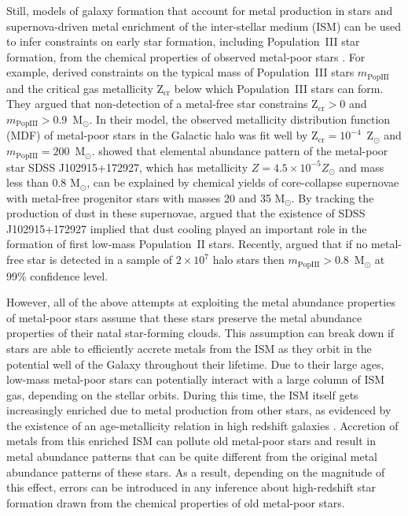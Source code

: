 \documentclass[a4paper,fleqn,usenatbib]{mnras}
\begin{document}
Still, models of galaxy formation that account for metal production in
stars and supernova-driven metal enrichment of the inter-stellar
medium (ISM) can be used to infer constraints on early star formation,
including Population~III star formation, from the chemical properties
of observed metal-poor stars \citep{2001PhR...349..125B,
  2004ARA&A..42...79B, 2005SSRv..116..625C, 2005SSRv..117..445G,
  2006jebh.book..239R, 2006MNRAS.369..825S, 2007MNRAS.381..647S,
  2009Natur.459...49B, 2009ApJ...696L..79K, 2010ApJ...717..542K,
  2012MNRAS.423L..60S, 2013RPPh...76k2901B, 2013pss5.book...55F,
  2014MNRAS.445.3039D, 2014ApJ...794..100M, 2015MNRAS.447.3892H,
  2015MNRAS.452.2822S, 2016MNRAS.462.1307S, 2016arXiv161005777D,
  2016arXiv161100759G}.  For example, \citet{2007MNRAS.381..647S}
derived constraints on the typical mass of Population~III stars
$m_\mathrm{PopIII}$ and the critical gas metallicity Z$_\mathrm{cr}$
below which Population~III stars can form.  They argued that
non-detection of a metal-free star constrains Z$_\mathrm{cr}>0$ and
$m_\mathrm{PopIII}>0.9$~M$_\odot$.  In their model, the observed
metallicity distribution function (MDF) of metal-poor stars in the
Galactic halo was fit well by Z$_\mathrm{cr}=10^{-4}$~Z$_\odot$ and
$m_\mathrm{PopIII}=200$~M$_\odot$.  \citet{2012MNRAS.423L..60S} showed
that elemental abundance pattern of the metal-poor star SDSS
J102915+172927, which has metallicity $Z=4.5\times 10^{-5} Z_\odot$
and mass less than 0.8 M$_\odot$, can be explained by chemical yields
of core-collapse supernovae with metal-free progenitor stars with
masses 20 and 35 M$_\odot$.  By tracking the production of dust in
these supernovae, \citet{2012MNRAS.423L..60S} argued that the
existence of SDSS J102915+172927 implied that dust cooling played an
important role in the formation of first low-mass Population~II stars.
Recently, \citet{2015MNRAS.447.3892H} argued that if no metal-free
star is detected in a sample of $2\times 10^7$ halo stars then
$m_\mathrm{PopIII}>0.8$~M$_\odot$ at 99\% confidence level.

However, all of the above attempts at exploiting the metal abundance
properties of metal-poor stars assume that these stars preserve the
metal abundance properties of their natal star-forming clouds.  This
assumption can break down if stars are able to efficiently accrete
metals from the ISM as they orbit in the potential well of the Galaxy
throughout their lifetime.  Due to their large ages, low-mass
metal-poor stars can potentially interact with a large column of ISM
gas, depending on the stellar orbits.  During this time, the ISM
itself gets increasingly enriched due to metal production from other
stars, as evidenced by the existence of an age-metallicity relation in
high redshift galaxies \citep{2006ApJ...644..813E,
  2008A&A...488..463M, 2012ApJ...755...89R}.  Accretion of metals from
this enriched ISM can pollute old metal-poor stars and result in metal
abundance patterns that can be quite different from the original metal
abundance patterns of these stars.  As a result, depending on the
magnitude of this effect, errors can be introduced in any inference
about high-redshift star formation drawn from the chemical properties
of old metal-poor stars.
\end{document}
